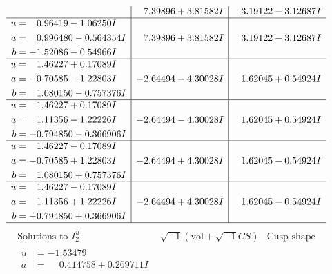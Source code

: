 \documentclass[1p]{elsarticle_modified}
\theoremstyle{definition}
\newcommand{\I}{\sqrt{-1}}
\begin{document}
$$\begin{array}{c|c|c}
 & \phantom{-}7.39896 + 3.81582 I & \phantom{-}3.19122 - 3.12687 I \\ \hline\begin{aligned}
u &= \phantom{-}0.96419 - 1.06250 I \\
a &= \phantom{-}0.996480 - 0.564354 I \\
b &= -1.52086 - 0.54966 I\end{aligned}
 & \phantom{-}7.39896 + 3.81582 I & \phantom{-}3.19122 - 3.12687 I \\ \hline\begin{aligned}
u &= \phantom{-}1.46227 + 0.17089 I \\
a &= -0.70585 - 1.22803 I \\
b &= \phantom{-}1.080150 - 0.757376 I\end{aligned}
 & -2.64494 - 4.30028 I & \phantom{-}1.62045 + 0.54924 I \\ \hline\begin{aligned}
u &= \phantom{-}1.46227 + 0.17089 I \\
a &= \phantom{-}1.11356 - 1.22226 I \\
b &= -0.794850 - 0.366906 I\end{aligned}
 & -2.64494 - 4.30028 I & \phantom{-}1.62045 + 0.54924 I \\ \hline\begin{aligned}
u &= \phantom{-}1.46227 - 0.17089 I \\
a &= -0.70585 + 1.22803 I \\
b &= \phantom{-}1.080150 + 0.757376 I\end{aligned}
 & -2.64494 + 4.30028 I & \phantom{-}1.62045 - 0.54924 I \\ \hline\begin{aligned}
u &= \phantom{-}1.46227 - 0.17089 I \\
a &= \phantom{-}1.11356 + 1.22226 I \\
b &= -0.794850 + 0.366906 I\end{aligned}
 & -2.64494 + 4.30028 I & \phantom{-}1.62045 - 0.54924 I\\
 \hline 
 \end{array}$$\newpage$$\begin{array}{c|c|c}  
\text{Solutions to }I^u_{2}& \I (\text{vol} + \sqrt{-1}CS) & \text{Cusp shape}\\
 \hline 
\begin{aligned}
u &= -1.53479\phantom{ +0.000000I} \\
a &= \phantom{-}0.414758 + 0.269711 I \\

\end{aligned}
\end{array}$$
\end{document}
